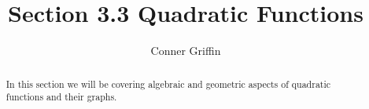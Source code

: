 \documentclass{ximera}
\title{Section 3.3 Quadratic Functions}
\author{Conner Griffin}
\begin{document}
\begin{abstract}
    In this section we will be covering algebraic and geometric aspects of quadratic functions and their graphs.
\end{abstract}
\maketitle








\end{document}
